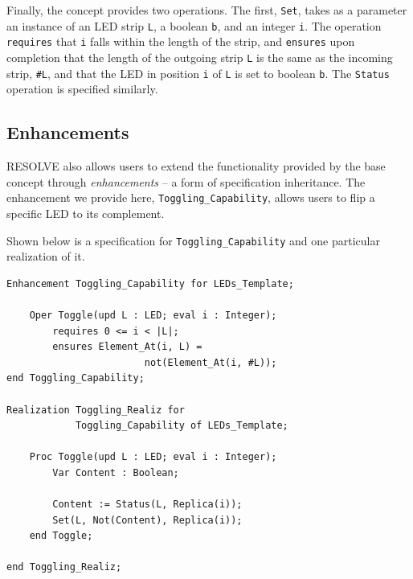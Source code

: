 \documentclass{sig-alternate}
\begin{document}
Finally, the concept provides two operations. The first, \texttt{Set}, takes as a parameter an instance of an LED strip \texttt{L}, a boolean \texttt{b}, and an integer \texttt{i}. The operation \texttt{requires} that \texttt{i} falls within the length of the strip, and \texttt{ensures} upon completion that the length of the outgoing strip \texttt{L} is the same as the incoming strip, \texttt{\#L}, and that the LED in position \texttt{i} of \texttt{L} is set to boolean \texttt{b}. The \texttt{Status} operation is specified similarly. 


\subsection{Enhancements}

RESOLVE also allows users to extend the functionality provided by the base concept through \textit{enhancements} -- a form of specification inheritance. The enhancement we provide here, \texttt{Toggling\_Capability}, allows users to flip a specific LED to its complement.

Shown below is a specification for \texttt{Toggling\_Capability} and one particular realization of it.

\begin{verbatim}
Enhancement Toggling_Capability for LEDs_Template;

    Oper Toggle(upd L : LED; eval i : Integer);
        requires 0 <= i < |L|;
        ensures Element_At(i, L) = 
                        not(Element_At(i, #L));
end Toggling_Capability;

Realization Toggling_Realiz for
            Toggling_Capability of LEDs_Template;

    Proc Toggle(upd L : LED; eval i : Integer);
        Var Content : Boolean;
        
        Content := Status(L, Replica(i));
        Set(L, Not(Content), Replica(i));
    end Toggle;
    
end Toggling_Realiz;
\end{verbatim}
\end{document}
